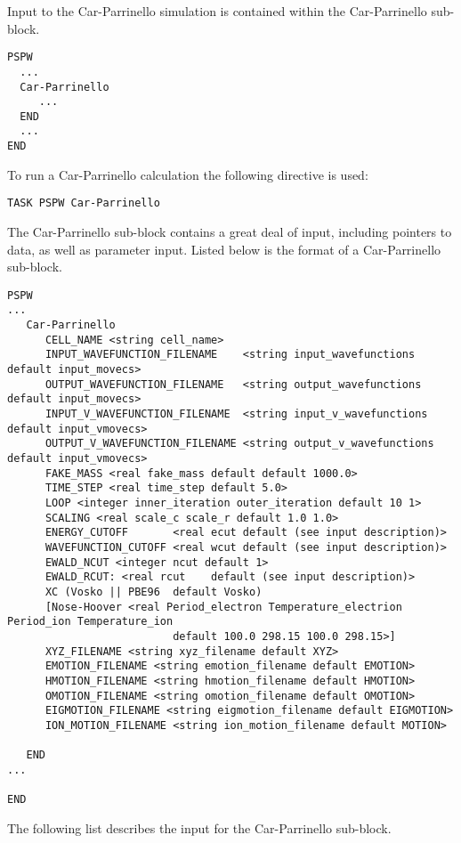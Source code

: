 Input to the Car-Parrinello simulation is contained within the
Car-Parrinello sub-block.
\begin{verbatim}
PSPW
  ...
  Car-Parrinello
     ...
  END
  ...
END
\end{verbatim}
To run a Car-Parrinello calculation the following directive is used:
\begin{verbatim}
TASK PSPW Car-Parrinello 
\end{verbatim}
The Car-Parrinello sub-block contains a great deal
of input, including pointers to data, as well as
parameter input.  Listed below is the format of a Car-Parrinello sub-block.
\begin{verbatim}
PSPW
...
   Car-Parrinello
      CELL_NAME <string cell_name>
      INPUT_WAVEFUNCTION_FILENAME    <string input_wavefunctions    default input_movecs>
      OUTPUT_WAVEFUNCTION_FILENAME   <string output_wavefunctions   default input_movecs>
      INPUT_V_WAVEFUNCTION_FILENAME  <string input_v_wavefunctions  default input_vmovecs>
      OUTPUT_V_WAVEFUNCTION_FILENAME <string output_v_wavefunctions default input_vmovecs>
      FAKE_MASS <real fake_mass default default 1000.0>
      TIME_STEP <real time_step default 5.0>
      LOOP <integer inner_iteration outer_iteration default 10 1>
      SCALING <real scale_c scale_r default 1.0 1.0>
      ENERGY_CUTOFF       <real ecut default (see input description)>
      WAVEFUNCTION_CUTOFF <real wcut default (see input description)>
      EWALD_NCUT <integer ncut default 1>
      EWALD_RCUT: <real rcut    default (see input description)>
      XC (Vosko || PBE96  default Vosko)
      [Nose-Hoover <real Period_electron Temperature_electrion Period_ion Temperature_ion 
                          default 100.0 298.15 100.0 298.15>]
      XYZ_FILENAME <string xyz_filename default XYZ>
      EMOTION_FILENAME <string emotion_filename default EMOTION>
      HMOTION_FILENAME <string hmotion_filename default HMOTION>
      OMOTION_FILENAME <string omotion_filename default OMOTION>
      EIGMOTION_FILENAME <string eigmotion_filename default EIGMOTION>
      ION_MOTION_FILENAME <string ion_motion_filename default MOTION>

   END
...

END
\end{verbatim}
The following list describes the input for the Car-Parrinello
sub-block.
